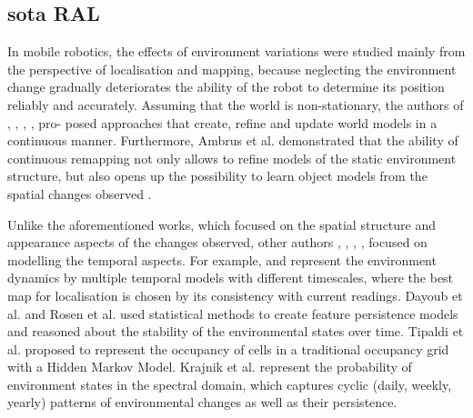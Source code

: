 \subsection{sota RAL}


 In  mobile  robotics,  the  effects  of  environment  variations were  studied  mainly  from  the  perspective  of  localisation and  mapping,  because  neglecting  the  environment  change gradually  deteriorates  the  ability  of  the  robot  to  determine its position reliably and accurately.
 Assuming that the world is non-stationary, the authors of \cite{biber2009experimental}, \cite{milford2010persistent}, \cite{konolige2009towards}, \cite{hochdorfer2009towards}, \cite{churchill2013experience} pro- posed approaches that create, refine and update world models in  a  continuous  manner.
  Furthermore,  Ambrus  et  al. \cite{ambrucs2014meta} demonstrated  that  the  ability  of  continuous  remapping  not only   allows   to   refine   models   of   the   static   environment structure,  but  also  opens  up  the  possibility  to  learn  object models from the spatial changes observed \cite{faulhammer2017autonomous}.

 Unlike  the  aforementioned  works,  which  focused  on  the spatial  structure  and  appearance  aspects  of  the  changes observed,  other  authors  \cite{biber2009experimental},  \cite{arbuckle2002temporal},  \cite{dayoub2011long},  \cite{tipaldi2013lifelong},  \cite{krajnik2017fremen}  focused  on modelling  the  temporal  aspects.
  For  example,  \cite{biber2009experimental}  and  \cite{arbuckle2002temporal} represent  the  environment  dynamics  by  multiple  temporal models  with  different  timescales,  where  the  best  map  for localisation  is  chosen  by  its  consistency  with  current  readings. Dayoub et al. \cite{dayoub2011long} and Rosen et al. \cite{rosen2016towards} used statistical methods  to  create  feature  persistence  models  and  reasoned about  the  stability  of  the  environmental  states  over  time.
 Tipaldi et al. \cite{tipaldi2013lifelong} proposed to represent the occupancy of cells in a traditional occupancy grid with a Hidden Markov Model.
 Krajnik  et  al. \cite{krajnik2017fremen}  represent  the  probability  of  environment states  in  the  spectral  domain,  which  captures  cyclic  (daily, weekly, yearly) patterns of environmental changes as well as their persistence.

